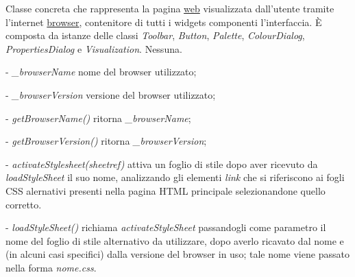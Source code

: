 Classe concreta che rappresenta la pagina \underline{web} visualizzata dall'utente tramite l'internet \underline{browser}, contenitore di tutti i widgets componenti l'interfaccia.
\` E composta da istanze delle classi \textit{Toolbar}, \textit{Button}, \textit{Palette}, \textit{ColourDialog}, \textit{PropertiesDialog} e \textit{Visualization}.
Nessuna.
\begin{elencopuntato}[\subsubsecindent]
\item[-] \textit{{\_}browserName} nome del browser utilizzato;
\item[-] \textit{{\_}browserVersion} versione del browser utilizzato;
\end{elencopuntato}
\begin{elencopuntato}[\subsubsecindent]
\item[-] \textit{getBrowserName()} ritorna \textit{{\_}browserName};
\item[-] \textit{getBrowserVersion()} ritorna \textit{{\_}browserVersion};
\item[-] \textit{activateStylesheet(sheetref)} attiva un foglio di stile dopo aver ricevuto da \textit{loadStyleSheet} il suo nome, analizzando gli elementi \textit{link} che si riferiscono ai fogli CSS alernativi presenti nella pagina HTML principale selezionandone quello corretto.  
\item[-] \textit{loadStyleSheet()} richiama \textit{activateStyleSheet} passandogli come parametro il nome del foglio di stile alternativo da utilizzare, dopo averlo ricavato dal nome e (in alcuni casi specifici) dalla versione del browser in uso; tale nome viene passato nella forma \textit{nome.css}.
\end{elencopuntato}

